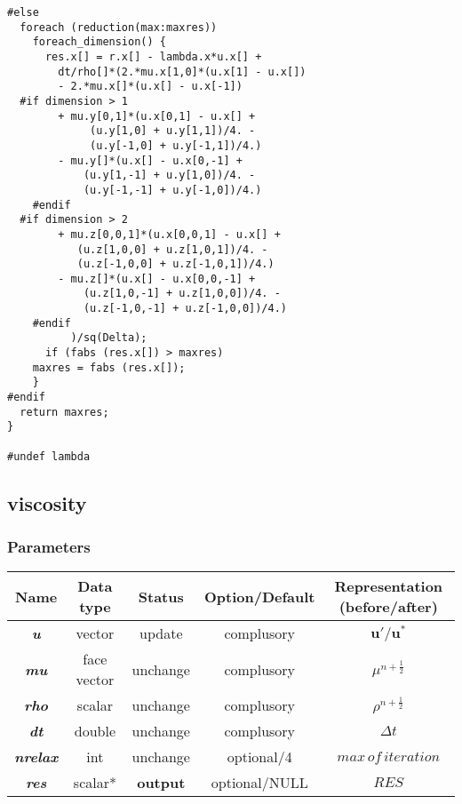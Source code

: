 \documentclass[a4paper]{article}
\newcommand{\func}[1]{\textbf{\textcolor{function}{#1}}}
\newcommand{\para}[1]{\textbf{\emph{\textcolor{para}{#1}}}}
\begin{document}
\begin{multicols}{2}
  \columnbreak
  \begin{verbatim}
#else
  foreach (reduction(max:maxres))
    foreach_dimension() {
      res.x[] = r.x[] - lambda.x*u.x[] +
        dt/rho[]*(2.*mu.x[1,0]*(u.x[1] - u.x[])
        - 2.*mu.x[]*(u.x[] - u.x[-1])
  #if dimension > 1
        + mu.y[0,1]*(u.x[0,1] - u.x[] +
             (u.y[1,0] + u.y[1,1])/4. -
             (u.y[-1,0] + u.y[-1,1])/4.)
        - mu.y[]*(u.x[] - u.x[0,-1] +
            (u.y[1,-1] + u.y[1,0])/4. -
            (u.y[-1,-1] + u.y[-1,0])/4.)
	#endif
  #if dimension > 2
        + mu.z[0,0,1]*(u.x[0,0,1] - u.x[] +
           (u.z[1,0,0] + u.z[1,0,1])/4. -
           (u.z[-1,0,0] + u.z[-1,0,1])/4.)
        - mu.z[]*(u.x[] - u.x[0,0,-1] +
            (u.z[1,0,-1] + u.z[1,0,0])/4. -
            (u.z[-1,0,-1] + u.z[-1,0,0])/4.)
	#endif
		  )/sq(Delta);
      if (fabs (res.x[]) > maxres)
	maxres = fabs (res.x[]);
    }
#endif
  return maxres;
}

#undef lambda
  \end{verbatim}
\end{multicols}

\subsection{\func{viscosity}}
\subsubsection{Parameters}
\begin{center}
  \begin{tabular}{|c|c|c|c|c|}
    \hline
    Name & Data type & Status & Option/Default & Representation (before/after)\\[0.5ex]
    \hline\hline
    \rowcolor{output}\para{u} & vector & update & complusory & $ \mathbf{u}'/ \mathbf{u}^*$\\
    \hline
    \para{mu} & face vector & unchange & complusory & $ \mu^{n+ \frac{1}{2}}$\\
    \hline
    \para{rho} & scalar & unchange & complusory & $\rho^{n+ \frac{1}{2}}$\\
    \hline
    \para{dt} & double & unchange & complusory & $\Delta t$ \\
    \hline
    \para{nrelax} & int & unchange & optional/4 & $ max\, of \, iteration$ \\
    \hline
    \rowcolor{output}\para{res} & scalar* & \textbf{output} & optional/NULL & $RES$ \\
    \hline
  \end{tabular}
\end{center}
\end{document}
